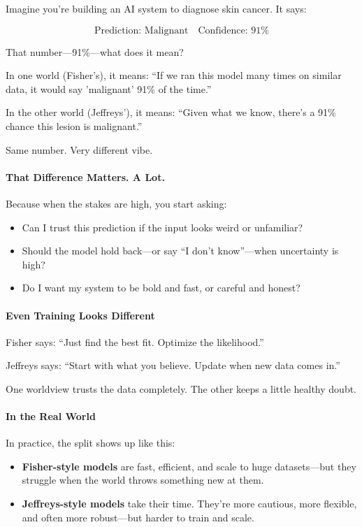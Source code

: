 Imagine you’re building an AI system to diagnose skin cancer. It says:

\[
\text{Prediction: Malignant} \quad \text{Confidence: 91\%}
\]

That number—91\%—what does it mean?

In one world (Fisher’s), it means:  
“If we ran this model many times on similar data, it would say 'malignant' 91\% of the time.”

In the other world (Jeffreys’), it means:  
“Given what we know, there’s a 91\% chance this lesion is malignant.”

Same number. Very different vibe.

\paragraph{That Difference Matters. A Lot.}

Because when the stakes are high, you start asking:

\begin{itemize}
    \item Can I trust this prediction if the input looks weird or unfamiliar?
    \item Should the model hold back—or say “I don’t know”—when uncertainty is high?
    \item Do I want my system to be bold and fast, or careful and honest?
\end{itemize}

\paragraph{Even Training Looks Different}

Fisher says: “Just find the best fit. Optimize the likelihood.”

Jeffreys says: “Start with what you believe. Update when new data comes in.”

One worldview trusts the data completely.  
The other keeps a little healthy doubt.

\paragraph{In the Real World}

In practice, the split shows up like this:

\begin{itemize}
    \item \textbf{Fisher-style models} are fast, efficient, and scale to huge datasets—but they struggle when the world throws something new at them.
    \item \textbf{Jeffreys-style models} take their time. They’re more cautious, more flexible, and often more robust—but harder to train and scale.
\end{itemize}

